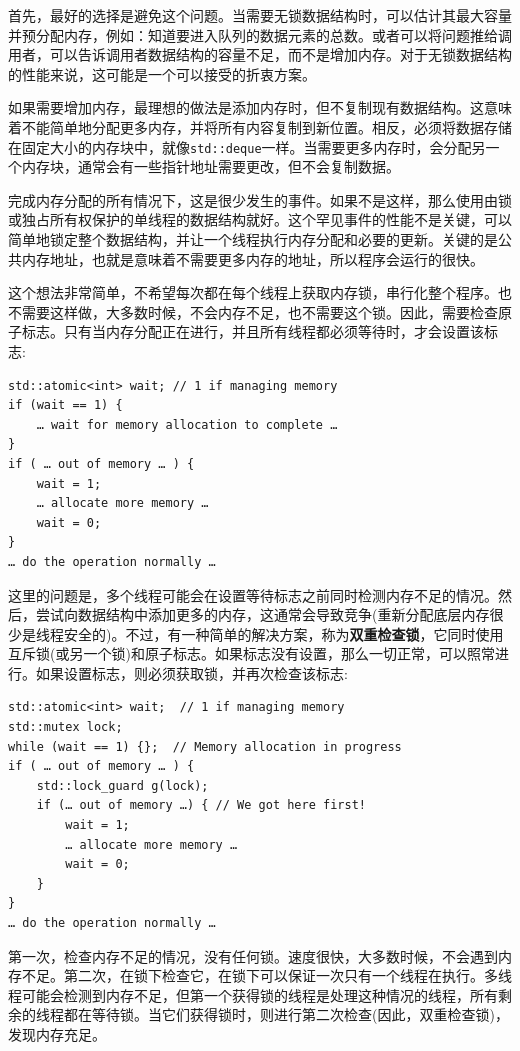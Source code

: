 首先，最好的选择是避免这个问题。当需要无锁数据结构时，可以估计其最大容量并预分配内存，例如：知道要进入队列的数据元素的总数。或者可以将问题推给调用者，可以告诉调用者数据结构的容量不足，而不是增加内存。对于无锁数据结构的性能来说，这可能是一个可以接受的折衷方案。

如果需要增加内存，最理想的做法是添加内存时，但不复制现有数据结构。这意味着不能简单地分配更多内存，并将所有内容复制到新位置。相反，必须将数据存储在固定大小的内存块中，就像\texttt{std::deque}一样。当需要更多内存时，会分配另一个内存块，通常会有一些指针地址需要更改，但不会复制数据。

完成内存分配的所有情况下，这是很少发生的事件。如果不是这样，那么使用由锁或独占所有权保护的单线程的数据结构就好。这个罕见事件的性能不是关键，可以简单地锁定整个数据结构，并让一个线程执行内存分配和必要的更新。关键的是公共内存地址，也就是意味着不需要更多内存的地址，所以程序会运行的很快。

这个想法非常简单，不希望每次都在每个线程上获取内存锁，串行化整个程序。也不需要这样做，大多数时候，不会内存不足，也不需要这个锁。因此，需要检查原子标志。只有当内存分配正在进行，并且所有线程都必须等待时，才会设置该标志:

\begin{lstlisting}[style=styleCXX]
std::atomic<int> wait; // 1 if managing memory
if (wait == 1) {
	… wait for memory allocation to complete …
}
if ( … out of memory … ) {
	wait = 1;
	… allocate more memory …
	wait = 0;
}
… do the operation normally … 
\end{lstlisting}

这里的问题是，多个线程可能会在设置等待标志之前同时检测内存不足的情况。然后，尝试向数据结构中添加更多的内存，这通常会导致竞争(重新分配底层内存很少是线程安全的)。不过，有一种简单的解决方案，称为\textbf{双重检查锁}，它同时使用互斥锁(或另一个锁)和原子标志。如果标志没有设置，那么一切正常，可以照常进行。如果设置标志，则必须获取锁，并再次检查该标志:

\begin{lstlisting}[style=styleCXX]
std::atomic<int> wait;  // 1 if managing memory
std::mutex lock;
while (wait == 1) {};  // Memory allocation in progress
if ( … out of memory … ) {
	std::lock_guard g(lock);
	if (… out of memory …) { // We got here first!
		wait = 1;
		… allocate more memory …
		wait = 0;
	}
}
… do the operation normally …
\end{lstlisting}

第一次，检查内存不足的情况，没有任何锁。速度很快，大多数时候，不会遇到内存不足。第二次，在锁下检查它，在锁下可以保证一次只有一个线程在执行。多线程可能会检测到内存不足，但第一个获得锁的线程是处理这种情况的线程，所有剩余的线程都在等待锁。当它们获得锁时，则进行第二次检查(因此，双重检查锁)，发现内存充足。

